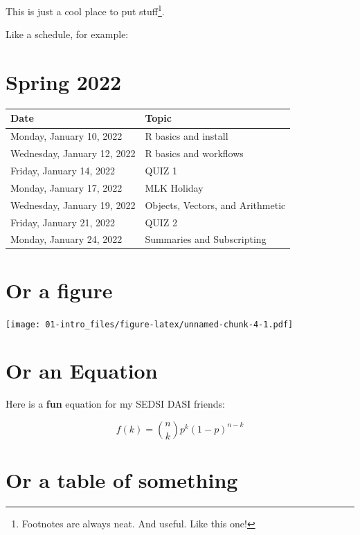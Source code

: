 \documentclass[
]{book}
\begin{document}
This is just a cool place to put stuff\footnote{Footnotes are always neat. And useful. Like this one!}.

Like a schedule, for example:

\hypertarget{spring-2022}{%
\section{Spring 2022}\label{spring-2022}}

\begin{longtable}[]{@{}ll@{}}
\toprule
Date & Topic \\
\midrule
\endhead
Monday, January 10, 2022 & R basics and install \\
Wednesday, January 12, 2022 & R basics and workflows \\
Friday, January 14, 2022 & QUIZ 1 \\
Monday, January 17, 2022 & MLK Holiday \\
Wednesday, January 19, 2022 & Objects, Vectors, and Arithmetic \\
Friday, January 21, 2022 & QUIZ 2 \\
Monday, January 24, 2022 & Summaries and Subscripting \\
\bottomrule
\end{longtable}

\hypertarget{or-a-figure}{%
\section{Or a figure}\label{or-a-figure}}

\texttt{[image: 01-intro\_files/figure-latex/unnamed-chunk-4-1.pdf]}

\hypertarget{or-an-equation}{%
\section{Or an Equation}\label{or-an-equation}}

Here is a \textbf{fun} equation for my SEDSI DASI friends:

\begin{equation} 
  f\left(k\right) = \binom{n}{k} p^k\left(1-p\right)^{n-k}
  \label{eq:binom}
\end{equation}

\hypertarget{or-a-table-of-something}{%
\section{Or a table of something}\label{or-a-table-of-something}}
\end{document}
